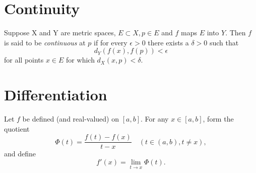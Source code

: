 \section{Continuity}

\begin{definition}
  Suppose X and Y are metric spaces, $E \subset X, p \in E$ and $f$ maps $E$ into $Y$. Then $f$ is said to be \textit{continuous} at $p$ if for every $\epsilon > 0$ there exists a $\delta > 0$ such that
  \begin{equation}
    d_Y(f(x), f(p)) < \epsilon
  \end{equation}
  for all points $x \in E$ for which $d_X(x, p) < \delta$.
\end{definition}

\section{Differentiation}

\begin{definition}
  Let $f$ be defined (and real-valued) on $[a, b]$. For any $x \in [a, b]$, form the quotient
  \begin{equation}
    \Phi(t) = \frac{f(t) - f(x)}{t - x} \quad (t \in (a, b), t \neq x),
  \end{equation}
  and define
  \begin{equation}
    f'(x) = \lim_{t \to x} \Phi(t).
  \end{equation}
\end{definition}
